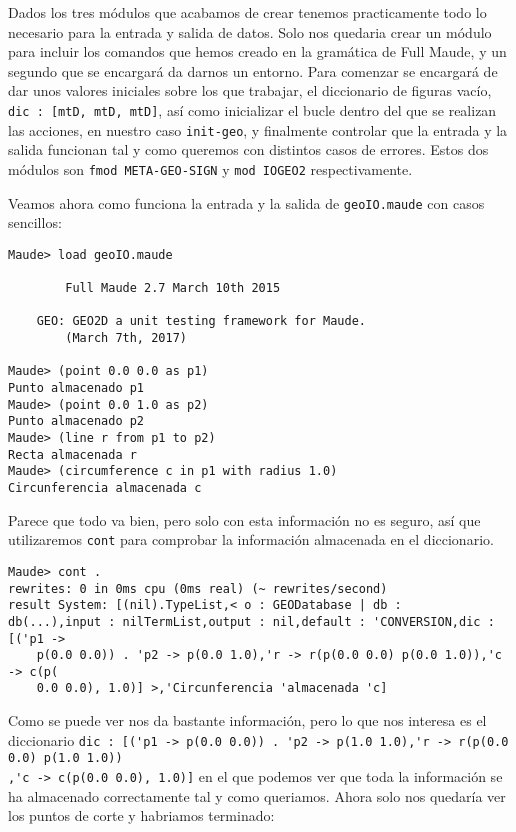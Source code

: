 Dados los tres módulos que acabamos de crear tenemos practicamente todo lo necesario para la entrada y salida de datos. Solo nos quedaria crear un módulo para incluir los comandos que hemos creado en la gramática de Full Maude, y un segundo que se encargará da darnos un entorno. Para comenzar se encargará de dar unos valores iniciales sobre los que trabajar, el diccionario de figuras vacío, \verb"dic : [mtD, mtD, mtD]", así como inicializar el bucle dentro del que se realizan las acciones, en nuestro caso \verb"init-geo", y finalmente controlar que la entrada y la salida funcionan tal y como queremos con distintos casos de errores. Estos dos módulos son \verb"fmod META-GEO-SIGN" y \verb"mod IOGEO2" respectivamente.\par

Veamos ahora como funciona la entrada y la salida de \texttt{geoIO.maude} con casos sencillos:\par 

{\codesize
\begin{verbatim}
Maude> load geoIO.maude

	    Full Maude 2.7 March 10th 2015

	GEO: GEO2D a unit testing framework for Maude.
		(March 7th, 2017)

Maude> (point 0.0 0.0 as p1)
Punto almacenado p1
Maude> (point 0.0 1.0 as p2)
Punto almacenado p2
Maude> (line r from p1 to p2)
Recta almacenada r
Maude> (circumference c in p1 with radius 1.0)
Circunferencia almacenada c
\end{verbatim}
}

Parece que todo va bien, pero solo con esta información no es seguro, así que utilizaremos \verb"cont" para comprobar la información almacenada en el diccionario.\par

{\codesize
\begin{verbatim}
Maude> cont .
rewrites: 0 in 0ms cpu (0ms real) (~ rewrites/second)
result System: [(nil).TypeList,< o : GEODatabase | db : 
db(...),input : nilTermList,output : nil,default : 'CONVERSION,dic : [('p1 ->
    p(0.0 0.0)) . 'p2 -> p(0.0 1.0),'r -> r(p(0.0 0.0) p(0.0 1.0)),'c -> c(p(
    0.0 0.0), 1.0)] >,'Circunferencia 'almacenada 'c]
\end{verbatim}
}

Como se puede ver nos da bastante información, pero lo que nos interesa es el diccionario \verb"dic : [('p1 -> p(0.0 0.0)) . 'p2 -> p(1.0 1.0),'r -> r(p(0.0 0.0) p(1.0 1.0))"\\ \verb",'c -> c(p(0.0 0.0), 1.0)]" en el que podemos ver que toda la información se ha almacenado correctamente tal y como queriamos. Ahora solo nos quedaría ver los puntos de corte y habriamos terminado:\par

